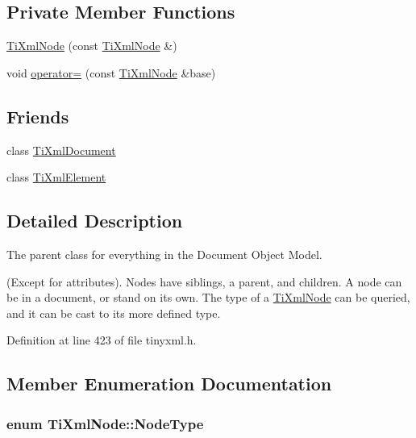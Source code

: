\subsection*{Private Member Functions}
\begin{DoxyCompactItemize}
\item 
\hyperlink{class_ti_xml_node_a5ca3233e05032d121b13fac8273de68d}{TiXmlNode} (const \hyperlink{class_ti_xml_node}{TiXmlNode} \&)
\item 
void \hyperlink{class_ti_xml_node_a9eb62a8d95b8a98ec2df481cc9e5a7e2}{operator=} (const \hyperlink{class_ti_xml_node}{TiXmlNode} \&base)
\end{DoxyCompactItemize}
\subsection*{Friends}
\begin{DoxyCompactItemize}
\item 
class \hyperlink{class_ti_xml_node_a173617f6dfe902cf484ce5552b950475}{TiXmlDocument}
\item 
class \hyperlink{class_ti_xml_node_ab6592e32cb9132be517cc12a70564c4b}{TiXmlElement}
\end{DoxyCompactItemize}


\subsection{Detailed Description}
The parent class for everything in the Document Object Model. 

(Except for attributes). Nodes have siblings, a parent, and children. A node can be in a document, or stand on its own. The type of a \hyperlink{class_ti_xml_node}{TiXmlNode} can be queried, and it can be cast to its more defined type. 

Definition at line 423 of file tinyxml.h.



\subsection{Member Enumeration Documentation}
\hypertarget{class_ti_xml_node_a836eded4920ab9e9ef28496f48cd95a2}{
\subsubsection[{NodeType}]{\setlength{\rightskip}{0pt plus 5cm}enum {\bf TiXmlNode::NodeType}}}
\label{class_ti_xml_node_a836eded4920ab9e9ef28496f48cd95a2}


